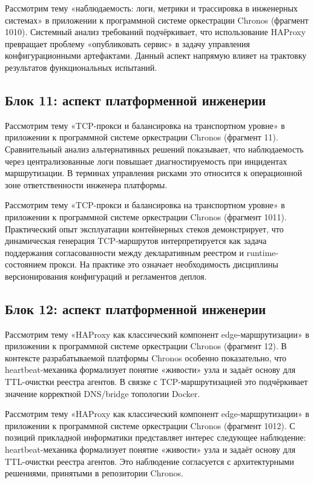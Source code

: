  Рассмотрим тему «наблюдаемость: логи, метрики и трассировка в инженерных системах» в приложении к программной системе оркестрации Chronos (фрагмент 1010). Системный анализ требований подчёркивает, что использование HAProxy превращает проблему «опубликовать сервис» в задачу управления конфигурационными артефактами. Данный аспект напрямую влияет на трактовку результатов функциональных испытаний.

\subsection{Блок 11: аспект платформенной инженерии}
 Рассмотрим тему «TCP-прокси и балансировка на транспортном уровне» в приложении к программной системе оркестрации Chronos (фрагмент 11). Сравнительный анализ альтернативных решений показывает, что наблюдаемость через централизованные логи повышает диагностируемость при инцидентах маршрутизации. В терминах управления рисками это относится к операционной зоне ответственности инженера платформы.

 Рассмотрим тему «TCP-прокси и балансировка на транспортном уровне» в приложении к программной системе оркестрации Chronos (фрагмент 1011). Практический опыт эксплуатации контейнерных стеков демонстрирует, что динамическая генерация TCP-маршрутов интерпретируется как задача поддержания согласованности между декларативным реестром и runtime-состоянием прокси. На практике это означает необходимость дисциплины версионирования конфигураций и регламентов деплоя.

\subsection{Блок 12: аспект платформенной инженерии}
 Рассмотрим тему «HAProxy как классический компонент edge-маршрутизации» в приложении к программной системе оркестрации Chronos (фрагмент 12). В контексте разрабатываемой платформы Chronos особенно показательно, что heartbeat-механика формализует понятие «живости» узла и задаёт основу для TTL-очистки реестра агентов. В связке с TCP-маршрутизацией это подчёркивает значение корректной DNS/bridge топологии Docker.

 Рассмотрим тему «HAProxy как классический компонент edge-маршрутизации» в приложении к программной системе оркестрации Chronos (фрагмент 1012). С позиций прикладной информатики представляет интерес следующее наблюдение: heartbeat-механика формализует понятие «живости» узла и задаёт основу для TTL-очистки реестра агентов. Это наблюдение согласуется с архитектурными решениями, принятыми в репозитории Chronos.

